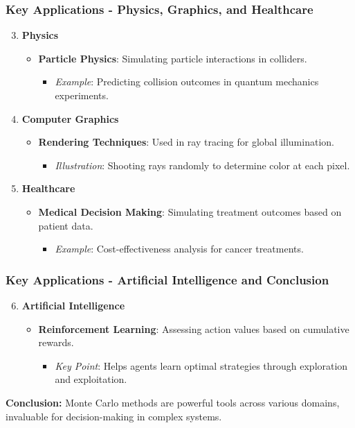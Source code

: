 \documentclass[aspectratio=169]{beamer}
\begin{document}
\begin{frame}
  \frametitle{Key Applications - Physics, Graphics, and Healthcare}
  \begin{enumerate}
    \setcounter{enumi}{2}
    \item \textbf{Physics}
      \begin{itemize}
        \item \textbf{Particle Physics}: Simulating particle interactions in colliders.
        \begin{itemize}
          \item \textit{Example}: Predicting collision outcomes in quantum mechanics experiments.
        \end{itemize}
      \end{itemize}

    \item \textbf{Computer Graphics}
      \begin{itemize}
        \item \textbf{Rendering Techniques}: Used in ray tracing for global illumination.
        \begin{itemize}
          \item \textit{Illustration}: Shooting rays randomly to determine color at each pixel.
        \end{itemize}
      \end{itemize}

    \item \textbf{Healthcare}
      \begin{itemize}
        \item \textbf{Medical Decision Making}: Simulating treatment outcomes based on patient data.
        \begin{itemize}
          \item \textit{Example}: Cost-effectiveness analysis for cancer treatments.
        \end{itemize}
      \end{itemize}
  \end{enumerate}
\end{frame}

\begin{frame}
  \frametitle{Key Applications - Artificial Intelligence and Conclusion}
  \begin{enumerate}
    \setcounter{enumi}{5}
    \item \textbf{Artificial Intelligence}
      \begin{itemize}
        \item \textbf{Reinforcement Learning}: Assessing action values based on cumulative rewards.
        \begin{itemize}
          \item \textit{Key Point}: Helps agents learn optimal strategies through exploration and exploitation.
        \end{itemize}
      \end{itemize}
  \end{enumerate}

  \textbf{Conclusion:} Monte Carlo methods are powerful tools across various domains, invaluable for decision-making in complex systems.
\end{frame}
\end{document}
